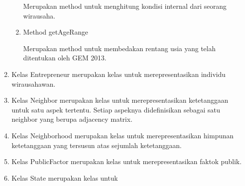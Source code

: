 \begin{enumerate}
\begin{enumerate}
			Merupakan method untuk menghitung kondisi internal dari seorang wirausaha.
			\item Method getAgeRange
			
			Merupakan method untuk membedakan rentang usia yang telah ditentukan oleh GEM 2013.
		\end{enumerate}
	\item Kelas Entrepreneur merupakan kelas untuk merepresentasikan individu wirausahawan.
	\item Kelas Neighbor merupakan kelas untuk merepresentasikan ketetanggaan untuk satu aspek tertentu. Setiap aspeknya didefinisikan sebagai satu neighbor yang berupa adjacency matrix.
	\item Kelas Neighborhood merupakan kelas untuk merepresentasikan himpunan ketetanggaan yang tersusun atas sejumlah ketetanggaan.
	\item Kelas PublicFactor merupakan kelas untuk merepresentasikan faktok publik.
	\item Kelas State merupakan kelas untuk 
\end{enumerate}
	




